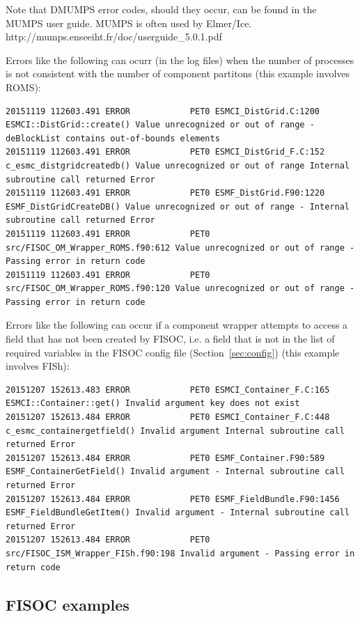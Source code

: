 \documentclass[12pt]{article}
\begin{document}
Note that DMUMPS error codes, should they occur, can be found in the MUMPS user guide.
MUMPS is often used by Elmer/Ice.
http://mumps.enseeiht.fr/doc/userguide\_5.0.1.pdf

Errors like the following can ocurr (in the log files) when the number of processes is 
not consistent with the number of component partitons (this example involves ROMS):
\begin{lstlisting}
20151119 112603.491 ERROR            PET0 ESMCI_DistGrid.C:1200 ESMCI::DistGrid::create() Value unrecognized or out of range - deBlockList contains out-of-bounds elements
20151119 112603.491 ERROR            PET0 ESMCI_DistGrid_F.C:152 c_esmc_distgridcreatedb() Value unrecognized or out of range Internal subroutine call returned Error
20151119 112603.491 ERROR            PET0 ESMF_DistGrid.F90:1220 ESMF_DistGridCreateDB() Value unrecognized or out of range - Internal subroutine call returned Error
20151119 112603.491 ERROR            PET0 src/FISOC_OM_Wrapper_ROMS.f90:612 Value unrecognized or out of range - Passing error in return code
20151119 112603.491 ERROR            PET0 src/FISOC_OM_Wrapper_ROMS.f90:120 Value unrecognized or out of range - Passing error in return code
\end{lstlisting}

Errors like the following can occur if a component wrapper attempts to access a field 
that has not been created by FISOC, i.e. a field that is not in the list of
required variables in the FISOC config file (Section~\ref{sec:config}) 
(this example involves FISh):
\begin{lstlisting}
20151207 152613.483 ERROR            PET0 ESMCI_Container_F.C:165 ESMCI::Container::get() Invalid argument key does not exist
20151207 152613.484 ERROR            PET0 ESMCI_Container_F.C:448 c_esmc_containergetfield() Invalid argument Internal subroutine call returned Error
20151207 152613.484 ERROR            PET0 ESMF_Container.F90:589 ESMF_ContainerGetField() Invalid argument - Internal subroutine call returned Error
20151207 152613.484 ERROR            PET0 ESMF_FieldBundle.F90:1456 ESMF_FieldBundleGetItem() Invalid argument - Internal subroutine call returned Error
20151207 152613.484 ERROR            PET0 src/FISOC_ISM_Wrapper_FISh.f90:198 Invalid argument - Passing error in return code
\end{lstlisting}





\subsection{FISOC examples}
\end{document}

